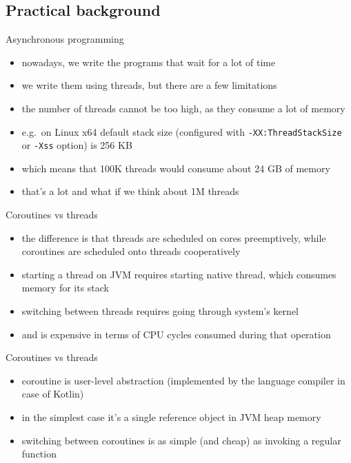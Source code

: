 \documentclass[hyperref={pdfpagelabels=false},xcolor={dvipsnames},compress,onlytextwidth]{beamer}
\begin{document}
    \subsection{Practical background}

    \begin{frame}{Asynchronous programming}
        \begin{itemize}
            \item nowadays, we write the programs that wait for a lot of time\pause
            \item we write them using threads, but there are a few limitations\pause
            \item the number of threads cannot be too high, as they consume a lot of memory\pause
            \item e.g.\ on Linux x64 default stack size (configured with \texttt{-XX:ThreadStackSize} or \texttt{-Xss} option) is 256 KB\pause
            \item which means that 100K threads would consume about 24 GB of memory\pause
            \item that's a lot and what if we think about 1M threads
        \end{itemize}
    \end{frame}

    \begin{frame}{Coroutines vs threads}
        \begin{itemize}
            \item the difference is that threads are scheduled on cores preemptively, while coroutines are scheduled onto threads cooperatively\pause
            \item starting a thread on JVM requires starting native thread, which consumes memory for its stack\pause
            \item switching between threads requires going through system's kernel\pause
            \item and is expensive in terms of CPU cycles consumed during that operation
        \end{itemize}
    \end{frame}

    \begin{frame}{Coroutines vs threads}
        \begin{itemize}
            \item coroutine is user-level abstraction (implemented by the language compiler in case of Kotlin)\pause
            \item in the simplest case it's a single reference object in JVM heap memory\pause
            \item switching between coroutines is as simple (and cheap) as invoking a regular function
        \end{itemize}
    \end{frame}
\end{document}
